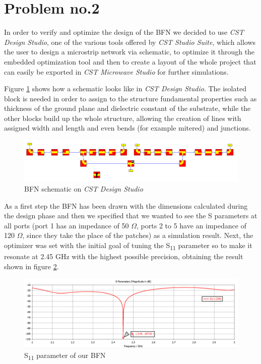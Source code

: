 \section{Problem no.2}

In order to verify and optimize the design of the BFN we decided to use \textit{CST Design Studio}, one of the various tools offered by \textit{CST Studio Suite}, which allows the user to design a microstrip network via schematic, to optimize it through the embedded optimization tool and then to create a layout of the whole project that can easily be exported in \textit{CST Microwave Studio} for further simulations.

\par\medskip
\noindent
Figure \ref{BFN_schematic} shows how a schematic looks like in \textit{CST Design Studio}. The isolated block is needed in order to assign to the structure fundamental properties such as thickness of the ground plane and dielectric constant of the substrate, while the other blocks build up the whole structure, allowing the creation of lines with assigned width and length and even bends (for example mitered) and junctions.

\begin{figure}[H]
\centering
\includegraphics[scale=0.4]{BFN_schematic.png}
\caption{BFN schematic on \textit{CST Design Studio}}
\label{BFN_schematic}
\end{figure}

\par\medskip
\noindent
As a first step the BFN has been drawn with the dimensions calculated during the design phase and then we specified that we wanted to see the S parameters at all ports (port 1 has an impedance of 50 $\Omega$, ports 2 to 5 have an impedance of 120 $\Omega$, since they take the place of the patches) as a simulation result. Next, the optimizer was set with the initial goal of tuning the S\textsubscript{11} parameter so to make it resonate at 2.45 GHz with the highest possible precision, obtaining the result shown in figure \ref{BFN_S11}.

\begin{figure}[H]
\centering
\includegraphics[scale=0.35]{BFN_S11.png}
\caption{S\textsubscript{11} parameter of our BFN}
\label{BFN_S11}
\end{figure}

